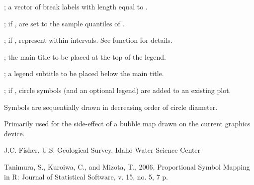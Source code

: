 \documentclass[letterpaper]{book}
\begin{document}
\begin{Arguments}
\begin{ldescription}
\item[\code{break.labels}] ; a vector of break labels with length equal to .
\item[\code{quantile.breaks}] ; if ,  are set to the sample quantiles of .
\item[\code{make.intervals}] ; if , represent  within intervals.
See  function for details.
\item[\code{title}] ; the main title to be placed at the top of the legend.
\item[\code{subtitle}] ; a legend subtitle to be placed below the main title.
\item[\code{add}] ; if , circle symbols (and an optional legend) are added to an existing plot.
\end{ldescription}
\end{Arguments}
%
\begin{Details}\relax
Symbols are sequentially drawn in decreasing order of circle diameter.
\end{Details}
%
\begin{Value}
Primarily used for the side-effect of a bubble map drawn on the current graphics device.
\end{Value}
%
\begin{Author}\relax
J.C. Fisher, U.S. Geological Survey, Idaho Water Science Center
\end{Author}
%
\begin{References}\relax
Tanimura, S., Kuroiwa, C., and Mizota, T., 2006, Proportional Symbol Mapping in R: Journal of Statistical Software, v. 15, no. 5, 7 p.
\end{References}
%
\begin{SeeAlso}\relax
{}
\end{SeeAlso}
%
\begin{Examples}
\end{Examples}
\end{document}
